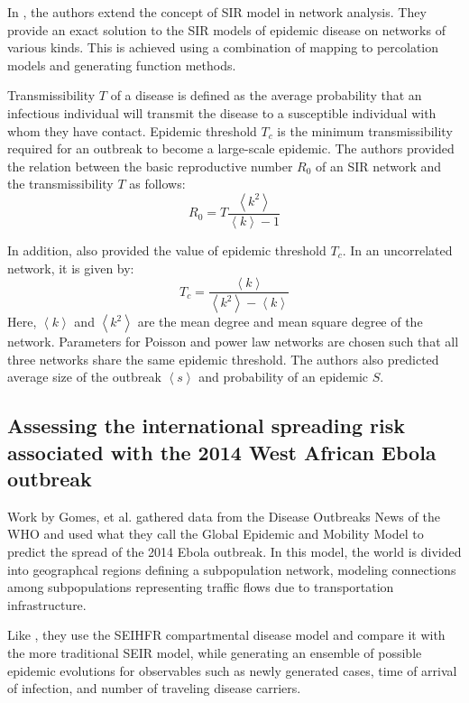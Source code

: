 \documentclass[12pt, journal,onecolumn]{IEEEtran}
\begin{document}
\bigskip 
In \citep{newman2002spread}, the authors extend the concept of SIR model in network analysis.
They provide an exact solution to the SIR models of epidemic disease on networks of various kinds.
This is achieved using a combination of mapping to percolation models and generating function methods.

Transmissibility $T$ of a disease is defined as the average probability that an infectious
individual will transmit the disease to a susceptible individual with whom they have contact.
Epidemic threshold $T_c$ is the minimum transmissibility required for an outbreak to become
a large-scale epidemic. The authors provided the relation between the basic reproductive number
$R_0$ of an SIR network and the transmissibility $T$ as follows:
\[
R_0 = T  \dfrac{\left\langle k^2 \right\rangle}{\left\langle k \right\rangle-1}
\]

In addition, \citep{newman2002spread} also provided the value of epidemic threshold $T_c$.  In an uncorrelated network, it is given by:
\[
T_c =\dfrac{\left\langle k \right\rangle}{\left\langle k^2 \right\rangle - \left\langle k \right\rangle}
\]
Here, $\left\langle k \right\rangle$ and $\left\langle k^2 \right\rangle$ are the mean degree and mean square degree of the network. Parameters for Poisson and power law networks are chosen such that all three networks share the same epidemic threshold. The authors also predicted average size of the outbreak $\left\langle s \right\rangle$ and probability of an epidemic $S$. 


\subsection{\textbf{Assessing the international spreading risk associated with the 2014 West African Ebola outbreak \citep{gomes2014assessing} }}

Work by Gomes, et al. \citep{gomes2014assessing} gathered data from the Disease Outbreaks News of
the WHO and used what they call the Global Epidemic and Mobility Model to predict the spread of the
2014 Ebola outbreak. In this model, the world is divided into geographcal regions defining a
subpopulation network, modeling connections among subpopulations representing traffic flows due to
transportation infrastructure.

Like \citep{legrand2007understanding}, they use the SEIHFR compartmental disease model and compare
it with the more traditional SEIR model, while
generating an ensemble of possible epidemic evolutions for observables such as newly generated
cases, time of arrival of infection, and number of traveling disease carriers.
\end{document}
